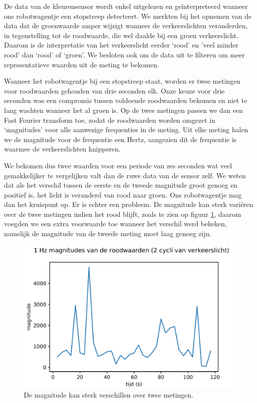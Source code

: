 \documentclass[a4paper,kulak]{kulakarticle}
\begin{document}
De data van de kleurensensor wordt enkel uitgelezen en geïnterpreteerd wanneer ons robotwagentje een stopstreep detecteert. We merkten bij het opnemen van de data dat de groenwaarde amper wijzigt wanneer de verkeerslichten veranderden, in tegenstelling tot de roodwaarde, die wel daalde bij een groen verkeerslicht. Daarom is de interpretatie van het verkeerslicht eerder `rood' en 'veel minder rood' dan `rood' of `groen'. We besloten ook om de data uit te filteren om meer representatieve waarden uit de meting te bekomen.

Wanneer het robotwagentje bij een stopstreep staat, worden er twee metingen voor roodwaarden gehouden van drie seconden elk. Onze keuze voor drie seconden was een compromis tussen voldoende roodwaarden bekomen en niet te lang wachten wanneer het al groen is. Op de twee metingen passen we dan een Fast Fourier transform toe, zodat de roodwaarden worden omgezet in `magnitudes' voor alle aanwezige frequenties in de meting. Uit elke meting halen we de magnitude voor de frequentie een Hertz, aangezien dit de frequentie is waarmee de verkeerslichten knipperen.

We bekomen dus twee waarden voor een periode van zes seconden wat veel gemakkelijker te vergelijken valt dan de ruwe data van de sensor zelf. We weten dat als het verschil tussen de eerste en de tweede magnitude groot genoeg en positief is, het licht is veranderd van rood naar groen. Ons robotwagentje mag dan het kruispunt op. Er is echter een probleem. De magnitude kan sterk variëren over de twee metingen indien het rood blijft, zoals te zien op figuur \ref{grafiek}, daarom voegden we een extra voorwaarde toe wanneer het verschil werd bekeken, namelijk de magnitude van de tweede meting moet laag genoeg zijn.

\begin{figure}[h]
	\centering
	\includegraphics[width=.8\textwidth] {magnitudes.PNG}
	\caption{ }
	\label{grafiek}
	\caption{De magnitude kan sterk verschillen over twee metingen.}
\end{figure}
\end{document}

